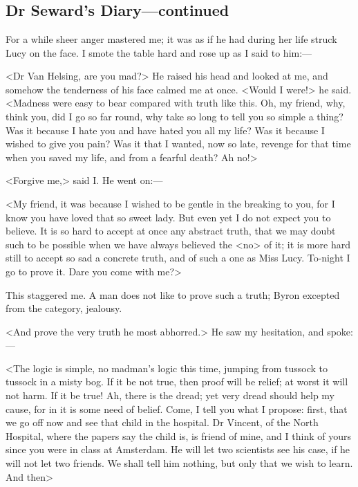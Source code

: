 \chapter[Chapter \thechapter]{}

\section{Dr Seward's Diary—continued}

For a while sheer anger mastered me; it was as if he had during her life struck Lucy on the face. I smote the table hard and rose up as I said to him:—

<Dr Van Helsing, are you mad?> He raised his head and looked at me, and somehow the tenderness of his face calmed me at once. <Would I were!> he said. <Madness were easy to bear compared with truth like this. Oh, my friend, why, think you, did I go so far round, why take so long to tell you so simple a thing? Was it because I hate you and have hated you all my life? Was it because I wished to give you pain? Was it that I wanted, now so late, revenge for that time when you saved my life, and from a fearful death? Ah no!>

<Forgive me,> said I\@. He went on:—

<My friend, it was because I wished to be gentle in the breaking to you, for I know you have loved that so sweet lady. But even yet I do not expect you to believe. It is so hard to accept at once any abstract truth, that we may doubt such to be possible when we have always believed the <no> of it; it is more hard still to accept so sad a concrete truth, and of such a one as Miss Lucy. To-night I go to prove it. Dare you come with me?>

This staggered me. A man does not like to prove such a truth; Byron excepted from the category, jealousy.

<And prove the very truth he most abhorred.>
He saw my hesitation, and spoke:—

<The logic is simple, no madman's logic this time, jumping from tussock to tussock in a misty bog. If it be not true, then proof will be relief; at worst it will not harm. If it be true! Ah, there is the dread; yet very dread should help my cause, for in it is some need of belief. Come, I tell you what I propose: first, that we go off now and see that child in the hospital. Dr Vincent, of the North Hospital, where the papers say the child is, is friend of mine, and I think of yours since you were in class at Amsterdam. He will let two scientists see his case, if he will not let two friends. We shall tell him nothing, but only that we wish to learn. And then\longdash>

